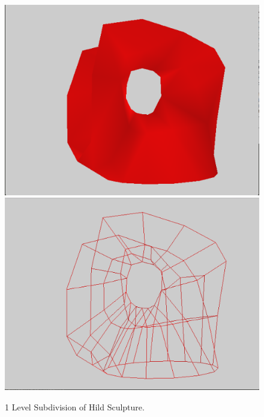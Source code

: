 \documentclass[12pt]{article}
\begin{document}
\begin{figure}[h!]
  \centering
    \includegraphics[width=\textwidth]{Hild1}
    \includegraphics[width=\textwidth]{Hild1w}
  \caption{1 Level Subdivision of Hild Sculpture.} \label{figure:Hild1}
\end{figure}
\end{document}
